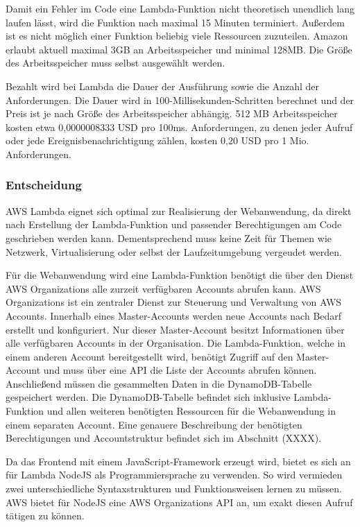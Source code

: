 {Damit ein Fehler im Code eine Lambda-Funktion nicht theoretisch unendlich lang laufen lässt, wird die Funktion nach maximal 15 Minuten terminiert.
Außerdem ist es nicht möglich einer Funktion beliebig viele Ressourcen zuzuteilen.
Amazon erlaubt aktuell maximal 3GB an Arbeitsspeicher und minimal 128MB.
Die Größe des Arbeitsspeicher muss selbst ausgewählt werden.

Bezahlt wird bei Lambda die Dauer der Ausführung sowie die Anzahl der Anforderungen.
Die Dauer wird in 100-Millisekunden-Schritten berechnet und der Preis ist je nach Größe des Arbeitsspeicher abhängig.
512 MB Arbeitsspeicher kosten etwa 0,0000008333 USD pro 100ms.
Anforderungen, zu denen jeder Aufruf oder jede Ereignisbenachrichtigung zählen, kosten 0,20 USD pro 1 Mio. Anforderungen.\cite[]{LambdaPreise}

\subsubsection{Entscheidung}
AWS Lambda eignet sich optimal zur Realisierung der Webanwendung, da direkt nach Erstellung der Lambda-Funktion und passender Berechtigungen am Code geschrieben werden kann.
Dementsprechend muss keine Zeit für Themen wie Netzwerk, Virtualisierung oder selbst der Laufzeitumgebung vergeudet werden.

Für die Webanwendung wird eine Lambda-Funktion benötigt die über den Dienst AWS Organizations alle zurzeit verfügbaren Accounts abrufen kann.
AWS Organizations ist ein zentraler Dienst zur Steuerung und Verwaltung von AWS Accounts.
Innerhalb eines Master-Accounts werden neue Accounts nach Bedarf erstellt und konfiguriert.
Nur dieser Master-Account besitzt Informationen über alle verfügbaren Accounts in der Organisation.
Die Lambda-Funktion, welche in einem anderen Account bereitgestellt wird, benötigt Zugriff auf den Master-Account und muss über eine API die Liste der Accounts abrufen können.
Anschließend müssen die gesammelten Daten in die DynamoDB-Tabelle gespeichert werden.
Die DynamoDB-Tabelle befindet sich inklusive Lambda-Funktion und allen weiteren benötigten Ressourcen für die Webanwendung in einem separaten Account.
Eine genauere Beschreibung der benötigten Berechtigungen und Accountstruktur befindet sich im Abschnitt (XXXX).

Da das Frontend mit einem JavaScript-Framework erzeugt wird, bietet es sich an für Lambda NodeJS als Programmiersprache zu verwenden.
So wird vermieden zwei unterschiedliche Syntaxstrukturen und Funktionsweisen lernen zu müssen.
AWS bietet für NodeJS eine AWS Organizations API an, um exakt diesen Aufruf tätigen zu können.
\cite[]{SDKListAccounts}

}
